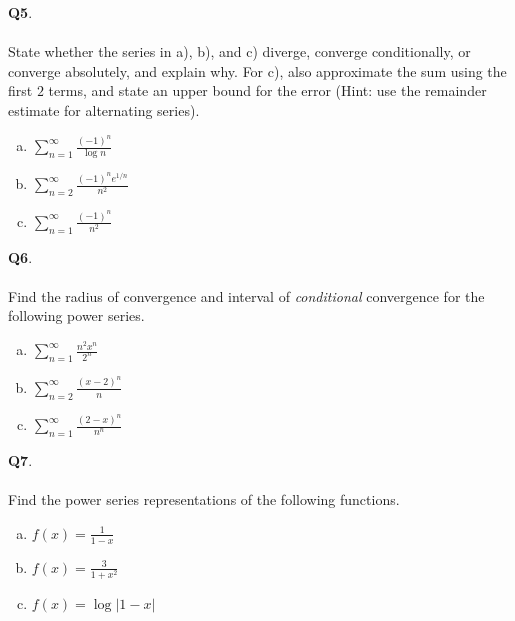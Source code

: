 \documentclass[12pt, oneside]{amsart}
\begin{document}
\newpage
\noindent
\textbf{Q5}. \\ \\ State whether the series in a), b), and c) diverge, converge conditionally, or converge absolutely, and explain why. For c), also approximate the sum using the first $2$ terms, and state an upper bound for the error (Hint: use the remainder estimate for alternating series).
\begin{enumerate}[a)]
  \item
$\displaystyle{\sum_{n=1}^{\infty} \frac{(-1)^{n}}{\log n}}$
    \vspace{6cm}
  \item
    $\displaystyle{\sum_{n=2}^{\infty} \frac{(-1)^{n} e^{1/n}}{n^{2}}}$
\vspace{6cm}
\item
  $ \displaystyle{\sum_{n=1}^{\infty} \frac{{(-1)^{n}}}{n^{2}}}$
  \newpage
\end{enumerate}
\textbf{Q6}. \\ \\ Find the radius of convergence and interval of \emph{conditional} convergence for the following power series.
\begin{enumerate}[a)]
  \item
$\displaystyle{\sum_{n=1}^{\infty} \frac{n^{2} x^{n}}{2^{n}}}$
    \vspace{6cm}
  \item
    $\displaystyle{\sum_{n=2}^{\infty} \frac{(x-2)^{n}}{n}}$
\vspace{6cm}
\item
  $ \displaystyle{\sum_{n=1}^{\infty} \frac{{(2-x)^{n}}}{n^{n}}}$
  \newpage
\end{enumerate}




\newpage
\noindent
\textbf{Q7}. \\ \\ Find the power series representations of the following functions.
\begin{enumerate}[a)]
  \item
    $\displaystyle{f(x) = \frac{1}{1-x}}$
    \vspace{6cm}
  \item
    $\displaystyle{f(x) = \frac{3}{1 + x^{2}}}$
\vspace{6cm}
\item
  $\displaystyle{f(x) = \log| 1-x |}$
  \newpage
\end{enumerate}
\end{document}
